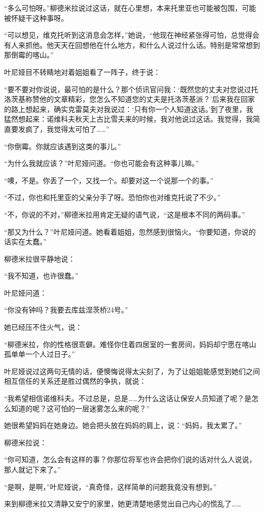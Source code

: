 “多么可怕呀。”柳德米拉说过这话，就在心里想，本来托里亚也可能被包围，可能被怀疑干这种事呀。

“可以想见，维克托听到这消息会怎样，”她说，“他现在神经紧张得可怕，总觉得会有人来抓他。他天天在回想他在什么地方，和什么人说过什么话。特别是常常想到那倒霉的喀山。”

叶尼娅目不转睛地对着姐姐看了一阵子，终于说：

“要不要对你说说，最可怕的是什么？那个侦讯官问我：‘既然您的丈夫对您说过托洛茨基称赞他的文章精彩，您怎么不知道您的丈夫是托洛茨基派？’后来我在回家的路上想起来，确实克雷莫夫对我说过：‘只有你一个人知道这话。’到了夜里，我猛然想起来：诺维科夫秋天上古比雪夫来的时候，我对他说过这话。我觉得，我简直要发疯了，我觉得太可怕了……”

“你倒霉。你就应该遇到这类的事儿。”

“为什么我就应该？”叶尼娅问道。“你也可能会有这种事儿嘛。”

“噢，不是。你丢了一个，又找一个。却要对这一个说那一个的事。”

“不过，你也和托里亚的父亲分手了呀。恐怕你也对维克托说了不少。”

“不，你说的不对，”柳德米拉用肯定无疑的语气说，“这是根本不同的两码事。”

“那又为什么？”叶尼娅问道。她看着姐姐，忽然感到很恼火。“你要知道，你说的话实在太蠢。”

柳德米拉很平静地说：

“我不知道，也许很蠢。”

叶尼娅问道：

“你没有钟吗？我要去库兹涅茨桥24号。”

她已经压不住火气，说：

“柳德米拉，你的性格很乖僻。难怪你住着四居室的一套房间，妈妈却宁愿在喀山孤单单一个人过日子。”

叶尼娅说过这两句无情的话，便懊悔说得太尖刻了，为了让姐姐能感觉到她们之间相互信任的关系还是胜过偶然的争执，就说：

“我希望相信诺维科夫。不过总是，总是……为什么这话让保安人员知道了呢？是怎么知道的呢？这可怕的一层迷雾怎么来的呢？”

她很希望妈妈在她身边。她会把头放在妈妈的肩上，说：“妈妈，我太累了。”

柳德米拉说：

“你可知道，怎么会有这样的事？你那位将军也许会把你们说的话对什么人说说，那人就记下来了。”

“是啊，是啊，”叶尼娅说，“真奇怪，这样简单的问题我竟没有想到。”

来到柳德米拉又清静又安宁的家里，她更清楚地感觉出自己内心的慌乱了……

